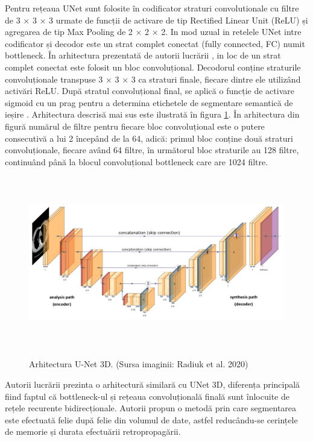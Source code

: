 Pentru rețeaua UNet sunt folosite în codificator straturi convolutionale cu filtre de 3 × 3 × 3 urmate de funcții de activare de tip Rectified Linear Unit (ReLU)\cite{DBLP:journals/corr/abs-1803-08375} și agregarea de tip Max Pooling de 2 × 2 × 2. In mod uzual in retelele UNet intre codificator și decodor este un strat complet conectat (fully connected, FC) numit bottleneck. În arhitectura prezentată de autorii lucrării \cite{radiuk2020}, in loc de un strat complet conectat este folosit un bloc convoluțional. Decodorul conține straturile convoluționale transpuse 3 × 3 × 3 ca straturi finale, fiecare dintre ele utilizând activări ReLU. După stratul convoluțional final, se aplică o funcție de activare sigmoid cu un prag pentru a determina etichetele de segmentare semantică de ieșire \cite{radiuk2020}. Arhitectura descrisă mai sus este ilustrată în figura \ref{fig:UNet}. În arhitectura din figură numărul de filtre pentru fiecare bloc convoluțional este o putere consecutivă a lui 2 începând de la 64, adică: primul bloc conține două straturi convoluționale, fiecare având 64 filtre, în următorul bloc straturile au 128 filtre, continuând până la blocul convoluțional bottleneck care are 1024 filtre.

\begin{figure}[!htb]
    \centering
    \includegraphics[height=7.5cm]{images/schema_UNET_radiuk.jpg}
    \\
    \caption{Arhitectura U-Net 3D. (Sursa imaginii: Radiuk et al. 2020\cite{radiuk2020})}
    \label{fig:UNet}
\end{figure}

Autorii lucrării \cite{sequential2019} prezinta o arhitectură similară cu UNet 3D, diferența principală fiind faptul că bottleneck-ul și rețeaua convoluțională finală sunt înlocuite de rețele recurente bidirecționale. Autorii propun o metodă prin care segmentarea este efectuată felie după felie din volumul de date, astfel reducându-se cerințele de memorie și durata efectuării retropropagării.

